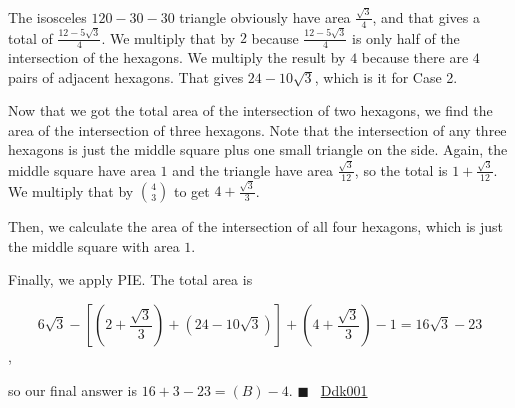 \begin{enumerate}
 The isosceles $120-30-30$ triangle obviously have area $\frac{\sqrt{3}}{4}$, and that gives a total of $\frac{12-5\sqrt{3}}{4}$. We multiply that by $2$ because $\frac{12-5\sqrt{3}}{4}$ is only half of the intersection of the hexagons. We multiply the result by $4$ because there are $4$ pairs of adjacent hexagons. That gives $24-10\sqrt{3}$, which is it for Case 2. 

 
Now that we got the total area of the intersection of two hexagons, we find the area of the intersection of three hexagons. Note that the intersection of any three hexagons is just the middle square plus one small triangle on the side. Again, the middle square have area $1$ and the triangle have area $\frac{\sqrt{3}}{12}$, so the total is $1+\frac{\sqrt{3}}{12}$. We multiply that by $4\choose3$ to get $4+\frac{\sqrt{3}}{3}$.

 
Then, we calculate the area of the intersection of all four hexagons, which is just the middle square with area $1$. 

 
Finally, we apply PIE. The total area is 

 
 \[6\sqrt{3}-[(2+\frac{\sqrt{3}}{3})+(24-10\sqrt{3})]+(4+\frac{\sqrt{3}}{3})-1=16\sqrt{3}-23\],

 so our final answer is $16+3-23=\boxed{(B)-4}$. $\blacksquare$ ~\href{https://artofproblemsolving.com/wiki/index.php?title=Ddk001}{Ddk001}

 


\end{enumerate}